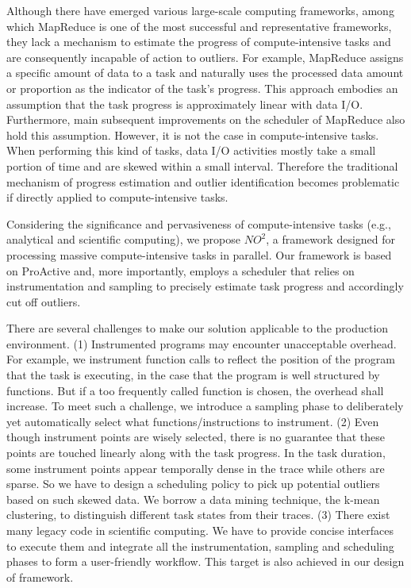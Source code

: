 Although there have emerged various large-scale computing frameworks, among which MapReduce is one of the most successful and representative frameworks, they lack a mechanism to estimate the progress of compute-intensive tasks and are consequently incapable of action to outliers. For example, MapReduce assigns a specific amount of data to a task and naturally uses the processed data amount or proportion as the indicator of the task's progress. This approach embodies an assumption that the task progress is approximately linear with data I/O. Furthermore, main subsequent improvements on the scheduler of MapReduce also hold this assumption. However, it is not the case in compute-intensive tasks. When performing this kind of tasks, data I/O activities mostly take a small portion of time and are skewed within a small interval. Therefore the traditional mechanism of progress estimation and outlier identification becomes problematic if directly applied to compute-intensive tasks.

Considering the significance and pervasiveness of compute-intensive tasks (e.g., analytical and scientific computing), we propose $NO^2$, a framework designed for processing massive compute-intensive tasks in parallel. Our framework is based on ProActive and, more importantly, employs a scheduler that relies on instrumentation and sampling to precisely estimate task progress and accordingly cut off outliers.

There are several challenges to make our solution applicable to the production environment. (1) Instrumented programs may encounter unacceptable overhead. For example, we instrument function calls to reflect the position of the program that the task is executing, in the case that the program is well structured by functions. But if a too frequently called function is chosen, the overhead shall increase. To meet such a challenge, we introduce a sampling phase to deliberately yet automatically select what functions/instructions to instrument. (2) Even though instrument points are wisely selected, there is no guarantee that these points are touched linearly along with the task progress. In the task duration, some instrument points appear temporally dense in the trace while others are sparse. So we have to design a scheduling policy to pick up potential outliers based on such skewed data. We borrow a data mining technique, the k-mean clustering, to distinguish different task states from their traces. (3) There exist many legacy code in scientific computing. We have to provide concise interfaces to execute them and integrate all the instrumentation, sampling and scheduling phases to form a user-friendly workflow. This target is also achieved in our design of framework.

